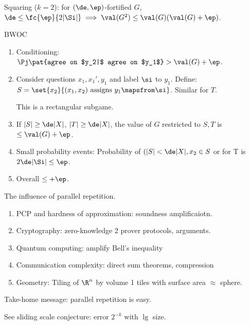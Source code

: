 Squaring ($k=2$): for $(\de,\ep)$-fortified $G$, $\de\le \fc{\ep}{2|\Si|}\implies \val(G^2)\le \val(G)(\val(G)+\ep)$.

BWOC
\begin{enumerate}
\item
Conditioning: $\Pj\pat{agree on $y_2|$ agree on $y_1$}>\val(G)+\ep$.
\item
Consider questions $x_1,x_1',y_1$ and label $\si$ to $y_1$. Define: $S=\set{x_2}{(x_1,x_2)\text{ assigns } y_1\mapsfrom \si}$.  Similar for $T$.

This is a rectangular subgame.
\item If $|S|\ge \de|X|$, $|T|\ge \de|X|$, the value of $G$ restricted to $S,T$ is $\le \val(G)+\ep$.
\item Small probability events: Probability of $(|S|<\de|X|,x_2\in S$ or for T is $2\de|\Si|\le \ep$.
\item Overall $\le +\ep$.
\end{enumerate}
The influence of parallel repetition.
\begin{enumerate}
\item
PCP and hardness of approximation: soundness amplificaiotn.
\item Cryptography: zero-knowledge 2 prover protocols, arguments.
\item
Quantum computing: amplify Bell's inequality
\item Communication complexity: direct sum theorems, compression
\item Geometry: Tiling of $\R^n$ by volume 1 tiles with surface area $\approx$ sphere.
\end{enumerate}
Take-home message: parallel repetition is easy.


See sliding scale conjecture: error $2^{-k}$ with $\lg$ size.
%
 
%
%
